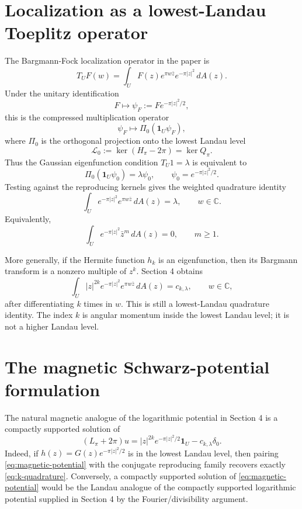 \documentclass[11pt]{article}
\newcommand{\C}{\mathbb C}
\newcommand{\1}{\mathbf 1}
\newcommand{\ddA}{\,dA}
\begin{document}
\section{Localization as a lowest-Landau Toeplitz operator}

The Bargmann-Fock localization operator in the paper is
\[
        T_UF(w)=\int_U F(z)e^{\pi w\bar z}e^{-\pi |z|^2}\ddA(z).
\]
Under the unitary identification
\[
        F\longmapsto \psi_F:=F e^{-\pi |z|^2/2},
\]
this is the compressed multiplication operator
\[
        \psi_F\longmapsto \Pi_0(\1_U\psi_F),
\]
where \(\Pi_0\) is the orthogonal projection onto the lowest Landau level
\[
        \mathcal L_0:=\ker(H_\pi-2\pi)=\ker Q_\pi .
\]
Thus the Gaussian eigenfunction condition \(T_U1=\lambda\) is equivalent to
\[
        \Pi_0(\1_U\psi_0)=\lambda\psi_0,
        \qquad
        \psi_0=e^{-\pi |z|^2/2}.
\]
Testing against the reproducing kernels gives the weighted quadrature identity
\begin{equation}\label{eq:k0-quadrature}
        \int_U e^{-\pi |z|^2}e^{\pi w\bar z}\ddA(z)=\lambda,
        \qquad w\in\C .
\end{equation}
Equivalently,
\[
        \int_U e^{-\pi |z|^2}\bar z^m\ddA(z)=0,
        \qquad m\ge 1.
\]

More generally, if the Hermite function \(h_k\) is an eigenfunction, then its
Bargmann transform is a nonzero multiple of \(z^k\).  Section 4 obtains
\begin{equation}\label{eq:k-quadrature}
        \int_U |z|^{2k}e^{-\pi |z|^2}e^{\pi w\bar z}\ddA(z)
        =c_{k,\lambda},
        \qquad w\in\C ,
\end{equation}
after differentiating \(k\) times in \(w\).  This is still a lowest-Landau
quadrature identity.  The index \(k\) is angular momentum inside the lowest
Landau level; it is not a higher Landau level.

\section{The magnetic Schwarz-potential formulation}

The natural magnetic analogue of the logarithmic potential in Section 4 is a
compactly supported solution of
\begin{equation}\label{eq:magnetic-potential}
        (L_\pi+2\pi)u
        =
        |z|^{2k}e^{-\pi |z|^2/2}\1_U
        -
        c_{k,\lambda}\delta_0 .
\end{equation}
Indeed, if \(h(z)=G(z)e^{-\pi |z|^2/2}\) is in the lowest Landau level, then
pairing \eqref{eq:magnetic-potential} with the conjugate reproducing family
recovers exactly \eqref{eq:k-quadrature}.  Conversely, a compactly supported
solution of \eqref{eq:magnetic-potential} would be the Landau analogue of the
compactly supported logarithmic potential supplied in Section 4 by the
Fourier/divisibility argument.
\end{document}
